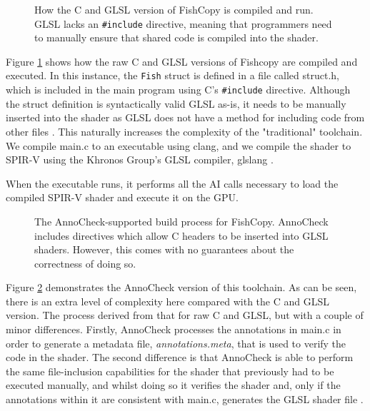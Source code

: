\documentclass[a4paper,12pt,twoside,openright]{report}
\begin{document}
\begin{figure}[h]
\centering
\def\svgwidth{0.8\linewidth}

\caption{How the C and GLSL version of FishCopy is compiled and run. GLSL lacks
an \texttt{\#include} directive, meaning that programmers need to manually
ensure that shared code is compiled into the shader.}
\label{fig:pipeline_basic}
\end{figure}

Figure \ref{fig:pipeline_basic} shows how the raw C and GLSL versions of
Fishcopy are compiled and executed. In this instance, the \texttt{Fish} struct
is defined in a file called struct.h, which is included in the main program
using C's \texttt{\#include} directive. Although the struct definition is
syntactically valid GLSL as-is, it needs to be manually inserted into the
shader as GLSL does not have a method for including code from other files
\cite{NoIncludeGLSL}. This naturally increases the complexity of the
"traditional" toolchain. We compile main.c to an executable using clang, and we
compile the shader to SPIR-V using the Khronos Group's GLSL compiler, glslang
\cite{glslang}.

When the executable runs, it performs all the AI calls necessary to load the
compiled SPIR-V shader and execute it on the GPU.

\begin{figure}[h]
\centering
\def\svgwidth{0.8\linewidth}

\caption{The AnnoCheck-supported build process for FishCopy. AnnoCheck includes
directives which allow C headers to be inserted into GLSL shaders. However, this
comes with no guarantees about the correctness of doing so.}
\label{fig:pipeline_anno_check}
\end{figure}

Figure \ref{fig:pipeline_anno_check} demonstrates the AnnoCheck version of this
toolchain. As can be seen, there is an extra level of complexity here compared
with the C and GLSL version. The process derived from that for raw C and GLSL,
but with a couple of minor differences. Firstly, AnnoCheck processes the
annotations in main.c in order to generate a metadata file,
\textit{annotations.meta}, that is used to verify the code in the shader. The
second difference is that AnnoCheck is able to perform the same file-inclusion
capabilities for the shader that previously had to be executed manually, and
whilst doing so it verifies the shader and, only if the annotations within it
are consistent with main.c, generates the GLSL shader file
\cite{NoIncludeGLSL}.
\end{document}
